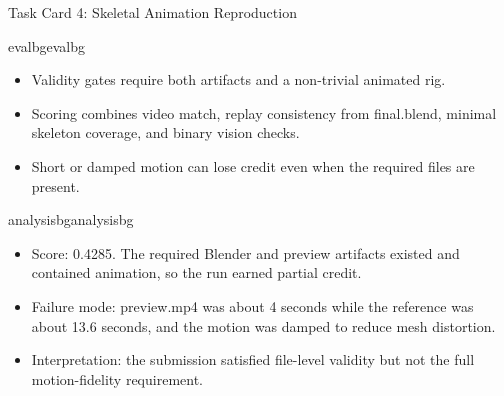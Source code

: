\begin{ColorTaskCard}{Task Card 4: Skeletal Animation Reproduction \hfill {}}
\begin{minipage}[t]{0.49\linewidth}
\end{minipage}\hfill
\begin{minipage}[t]{0.49\linewidth}
\vspace{0pt}
\begin{CardBlock}{evalbg}{evalbg}
\begin{itemize}
\item Validity gates require both artifacts and a non-trivial animated rig.
\item Scoring combines video match, replay consistency from final.blend, minimal skeleton coverage, and binary vision checks.
\item Short or damped motion can lose credit even when the required files are present.
\end{itemize}
\end{CardBlock}

\begin{CardBlock}{analysisbg}{analysisbg}
\begin{itemize}
\item Score: 0.4285. The required Blender and preview artifacts existed and contained animation, so the run earned partial credit.
\item Failure mode: preview.mp4 was about 4 seconds while the reference was about 13.6 seconds, and the motion was damped to reduce mesh distortion.
\item Interpretation: the submission satisfied file-level validity but not the full motion-fidelity requirement.
\end{itemize}
\end{CardBlock}
\end{minipage}
\end{ColorTaskCard}
\clearpage
